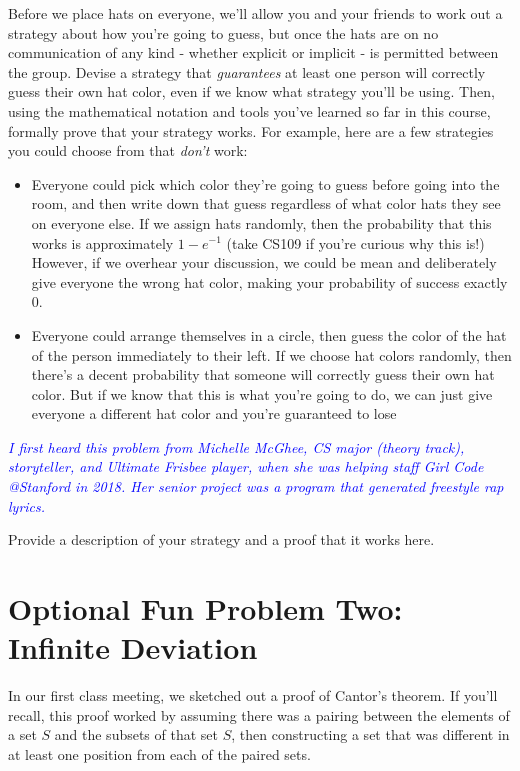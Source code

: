 \documentclass{article}
\renewcommand{\(}{\left(}
\renewcommand{\)}{\right)}
\newcommand{\annotate}[1]{\textit{\textcolor{blue}{#1}}}
\theoremstyle{plain}
\theoremstyle{plain}
\theoremstyle{definition}
\begin{document}
Before we place hats on everyone, we'll allow you and your friends to work out a strategy about how you're going to guess, but once the hats are on no communication of any kind - whether explicit or implicit - is permitted between the group. Devise a strategy that \textit{guarantees} at least one person will correctly guess their own hat color, even if we know what strategy you'll be using. Then, using the mathematical notation and tools you've learned so far in this course, formally prove that your strategy works. For example, here are a few strategies you could choose from that \textit{don't} work: 
\begin{itemize}
    \item Everyone could pick which color they're going to guess before going into the room, and then write down that guess regardless of what color hats they see on everyone else. If we assign hats randomly, then the probability that this works is approximately $1 - e^{-1}$ (take CS109 if you're curious why this is!) However, if we overhear your discussion, we could be mean and deliberately give everyone the wrong hat color, making your probability of success exactly 0.
    
    \item Everyone could arrange themselves in a circle, then guess the color of the hat of the person immediately to their left. If we choose hat colors randomly, then there's a decent probability that someone will correctly guess their own hat color. But if we know that this is what you're going to do, we can just give everyone a different hat color and you're guaranteed to lose
    
\end{itemize}

\annotate{I first heard this problem from Michelle McGhee, CS major (theory track), storyteller, and Ultimate Frisbee player, when she was helping staff Girl Code @Stanford in 2018. Her senior project was a program that generated freestyle rap lyrics.}

\begin{shaded}
Provide a description of your strategy and a proof that it works here.
\end{shaded}

\section*{Optional Fun Problem Two: Infinite Deviation}

In our first class meeting, we sketched out a proof of Cantor's theorem. If you'll recall, this proof worked by assuming there was a pairing between the elements of a set $S$ and the subsets of that set $S$, then constructing a set that was different in at least one position from each of the paired sets. \\
\end{document}
